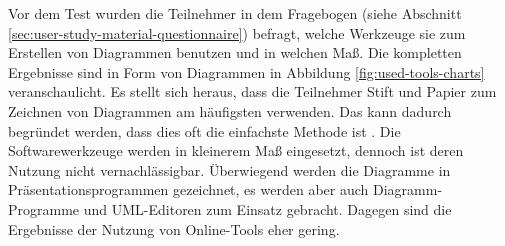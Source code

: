 Vor dem Test wurden die Teilnehmer in dem Fragebogen (siehe Abschnitt \ref{sec:user-study-material-questionnaire}) befragt, welche Werkzeuge sie zum Erstellen von Diagrammen benutzen und in welchen Maß. Die kompletten Ergebnisse sind in Form von Diagrammen in Abbildung \ref{fig:used-tools-charts} veranschaulicht. Es stellt sich heraus, dass die Teilnehmer Stift und Papier zum Zeichnen von Diagrammen am häufigsten verwenden. Das kann dadurch begründet werden, dass dies oft die einfachste Methode ist \cite{Ambler02Agile}. Die Softwarewerkzeuge werden in kleinerem Maß eingesetzt, dennoch ist deren Nutzung nicht vernachlässigbar. Überwiegend werden die Diagramme in Präsentationsprogrammen gezeichnet, es werden aber auch Diagramm-Programme und UML-Editoren zum Einsatz gebracht. Dagegen sind die Ergebnisse der Nutzung von Online-Tools eher gering. 

